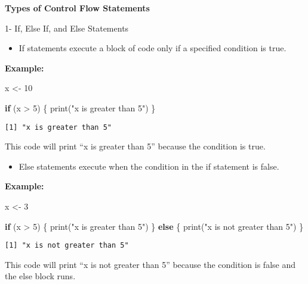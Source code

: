 \documentclass[
  man,
  floatsintext,
  longtable,
  nolmodern,
  notxfonts,
  notimes,
  colorlinks=true,linkcolor=blue,citecolor=blue,urlcolor=blue]{apa7}
\newenvironment{Shaded}{\begin{snugshade}}{\end{snugshade}}
\newcommand{\ControlFlowTok}[1]{\textcolor[rgb]{0.00,0.23,0.31}{\textbf{#1}}}
\newcommand{\DecValTok}[1]{\textcolor[rgb]{0.68,0.00,0.00}{#1}}
\newcommand{\FunctionTok}[1]{\textcolor[rgb]{0.28,0.35,0.67}{#1}}
\newcommand{\NormalTok}[1]{\textcolor[rgb]{0.00,0.23,0.31}{#1}}
\newcommand{\OtherTok}[1]{\textcolor[rgb]{0.00,0.23,0.31}{#1}}
\newcommand{\SpecialCharTok}[1]{\textcolor[rgb]{0.37,0.37,0.37}{#1}}
\newcommand{\StringTok}[1]{\textcolor[rgb]{0.13,0.47,0.30}{#1}}
\providecommand{\tightlist}{%
  \setlength{\itemsep}{0pt}\setlength{\parskip}{0pt}}
\begin{document}
\textbf{Types of Control Flow Statements}

1- If, Else If, and Else Statements

\begin{itemize}
\tightlist
\item
  If statements execute a block of code only if a specified condition is
  true.
\end{itemize}

\textbf{Example:}

\begin{Shaded}
\begin{Highlighting}[]
\NormalTok{x }\OtherTok{\textless{}{-}} \DecValTok{10}

\ControlFlowTok{if}\NormalTok{ (x }\SpecialCharTok{\textgreater{}} \DecValTok{5}\NormalTok{) \{}
  \FunctionTok{print}\NormalTok{(}\StringTok{"x is greater than 5"}\NormalTok{)}
\NormalTok{\}}
\end{Highlighting}
\end{Shaded}

\begin{verbatim}
[1] "x is greater than 5"
\end{verbatim}

This code will print ``x is greater than 5'' because the condition is
true.

\begin{itemize}
\tightlist
\item
  Else statements execute when the condition in the if statement is
  false.
\end{itemize}

\textbf{Example:}

\begin{Shaded}
\begin{Highlighting}[]
\NormalTok{x }\OtherTok{\textless{}{-}} \DecValTok{3}

\ControlFlowTok{if}\NormalTok{ (x }\SpecialCharTok{\textgreater{}} \DecValTok{5}\NormalTok{) \{}
  \FunctionTok{print}\NormalTok{(}\StringTok{"x is greater than 5"}\NormalTok{)}
\NormalTok{\} }\ControlFlowTok{else}\NormalTok{ \{}
  \FunctionTok{print}\NormalTok{(}\StringTok{"x is not greater than 5"}\NormalTok{)}
\NormalTok{\}}
\end{Highlighting}
\end{Shaded}

\begin{verbatim}
[1] "x is not greater than 5"
\end{verbatim}

This code will print ``x is not greater than 5'' because the condition
is false and the else block runs.
\end{document}
